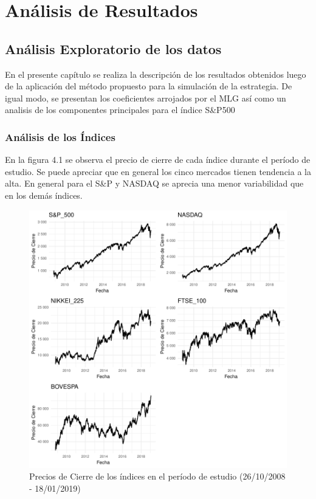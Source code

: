 \documentclass[a4paper,12pt]{Latex/Classes/PhDthesisPSnPDF}
\begin{document}
\chapter{Análisis de Resultados}

\section{Análisis Exploratorio de los datos}

En el presente capítulo se realiza la descripción de los resultados obtenidos luego de la aplicación del método propuesto para la simulación de la estrategia. De igual modo, se presentan los coeficientes arrojados por el MLG así como un analisis de los componentes principales para el índice S\&P500 


\subsection{Análisis de los Índices}

En la figura 4.1 se observa el precio de cierre de cada índice durante el período de estudio. Se puede apreciar que en general los cinco mercados tienen tendencia a la alta. En general para el S\&P y NASDAQ se aprecia una menor variabilidad que en los demás índices.


\begin{figure}[H]
\centering
\includegraphics{main-005}
\caption{Precios de Cierre de los índices en el período de estudio (26/10/2008 - 18/01/2019)}
\end{figure}
\end{document}
